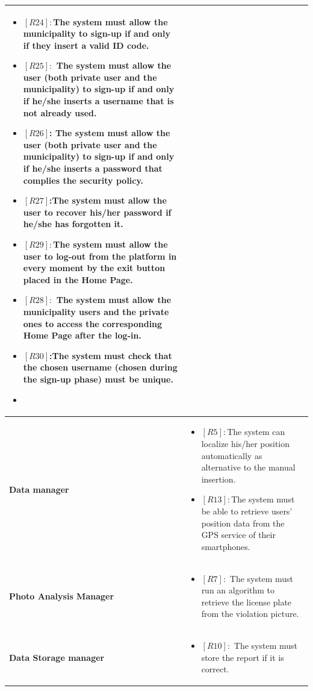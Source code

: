 \documentclass[titlepage]{article}
\begin{document}
\begin{longtable}{| p{7 cm} | p{8 cm} |}
\begin{itemize}
			\item \textbf{$[R24]:$}The system must allow the municipality to sign-up if and only if they insert a valid ID code. 
			\item \textbf{$[R25]:$} The system must allow the user (both private user and the municipality) to sign-up if and only if he/she inserts a username that is not already used.
			 \item \textbf{$[R26]$:} The system must allow the user (both private user and the municipality) to sign-up if and only if he/she inserts a password that complies the security policy. 
			 \item \textbf{$[R27]$:}The system must allow the user to recover his/her password if he/she has forgotten it. 
			 \item \textbf{$[R29]:$}The system must allow the user to log-out from the platform in every moment by the exit button placed in the Home Page. 
			 \item \textbf{$[R28]:$} The system must allow the municipality users and the private ones to access the corresponding Home Page after the log-in. 
			 \item \textbf{$[R30]$:}The system must check that the chosen username (chosen during the sign-up phase) must be unique. 
			 \item \textbf{}
		\end{itemize} \\ \hline
		\newline \textbf {Data manager} &
		\begin{itemize}
			\item \textbf{$[R5]:$}The system can localize his/her position automatically as alternative to the manual insertion.
			\item \textbf{$[R13]:$}The system must be able to retrieve users' position data from the GPS service of their smartphones. 
		\end{itemize} \\ \hline
		\newline \textbf {Photo Analysis Manager} &
		\begin{itemize}
		\item \textbf{$[R7]:$} The system must run an algorithm to retrieve the license plate from the violation picture. 
		\end{itemize} \\ \hline
		\newline \textbf {Data Storage manager} &
		\begin{itemize}
			\item \textbf{$[R10]:$} The system must store the report if it is correct.

\end{itemize}
\end{longtable}
\end{document}
